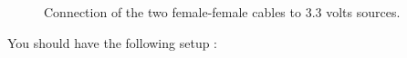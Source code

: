\documentclass[11pt]{article}
\begin{document}
\begin{figure}[H]
\caption{Connection of the two female-female cables to 3.3 volts sources.}
\label{power_on-enable}
\end{figure}
You should have the following setup :
\end{document}
